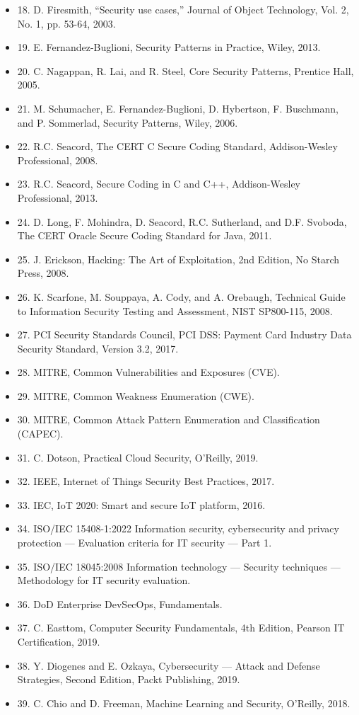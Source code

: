 \documentclass[a4paper,11pt]{ltjsarticle}
\numberwithin{figure}{section}
\numberwithin{table}{section}
\begin{document}
\begin{itemize}[leftmargin=2em]
\item 18. D. Firesmith, “Security use cases,” Journal of Object Technology, Vol. 2, No. 1, pp. 53-64, 2003.
\item 19. E. Fernandez-Buglioni, Security Patterns in Practice, Wiley, 2013.
\item 20. C. Nagappan, R. Lai, and R. Steel, Core Security Patterns, Prentice Hall, 2005.
\item 21. M. Schumacher, E. Fernandez-Buglioni, D. Hybertson, F. Buschmann, and P. Sommerlad, Security Patterns, Wiley, 2006.
\item 22. R.C. Seacord, The CERT C Secure Coding Standard, Addison-Wesley Professional, 2008.
\item 23. R.C. Seacord, Secure Coding in C and C++, Addison-Wesley Professional, 2013.
\item 24. D. Long, F. Mohindra, D. Seacord, R.C. Sutherland, and D.F. Svoboda, The CERT Oracle Secure Coding Standard for Java, 2011.
\item 25. J. Erickson, Hacking: The Art of Exploitation, 2nd Edition, No Starch Press, 2008.
\item 26. K. Scarfone, M. Souppaya, A. Cody, and A. Orebaugh, Technical Guide to Information Security Testing and Assessment, NIST SP800-115, 2008.
\item 27. PCI Security Standards Council, PCI DSS: Payment Card Industry Data Security Standard, Version 3.2, 2017.
\item 28. MITRE, Common Vulnerabilities and Exposures (CVE).
\item 29. MITRE, Common Weakness Enumeration (CWE).
\item 30. MITRE, Common Attack Pattern Enumeration and Classification (CAPEC).
\item 31. C. Dotson, Practical Cloud Security, O’Reilly, 2019.
\item 32. IEEE, Internet of Things Security Best Practices, 2017.
\item 33. IEC, IoT 2020: Smart and secure IoT platform, 2016.
\item 34. ISO/IEC 15408-1:2022 Information security, cybersecurity and privacy protection — Evaluation criteria for IT security — Part 1.
\item 35. ISO/IEC 18045:2008 Information technology — Security techniques — Methodology for IT security evaluation.
\item 36. DoD Enterprise DevSecOps, Fundamentals.
\item 37. C. Easttom, Computer Security Fundamentals, 4th Edition, Pearson IT Certification, 2019.
\item 38. Y. Diogenes and E. Ozkaya, Cybersecurity — Attack and Defense Strategies, Second Edition, Packt Publishing, 2019.
\item 39. C. Chio and D. Freeman, Machine Learning and Security, O’Reilly, 2018.
\end{itemize}
\end{document}
